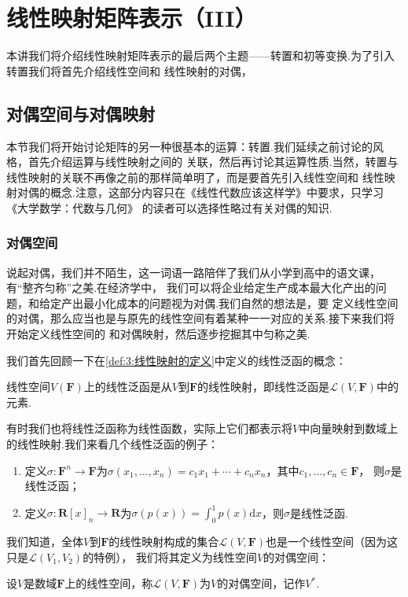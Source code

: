 \chapter{线性映射矩阵表示（III）}

本讲我们将介绍线性映射矩阵表示的最后两个主题——转置和初等变换.为了引入转置我们将首先介绍线性空间和
线性映射的对偶，

\section{对偶空间与对偶映射}
本节我们将开始讨论矩阵的另一种很基本的运算：转置.我们延续之前讨论的风格，首先介绍运算与线性映射之间的
关联，然后再讨论其运算性质.当然，转置与线性映射的关联不再像之前的那样简单明了，而是要首先引入线性空间和
线性映射对偶的概念.注意，这部分内容只在《线性代数应该这样学》中要求，只学习《大学数学：代数与几何》
的读者可以选择性略过有关对偶的知识.

\subsection{对偶空间}
说起对偶，我们并不陌生，这一词语一路陪伴了我们从小学到高中的语文课，有``整齐匀称''之美.在经济学中，
我们可以将企业给定生产成本最大化产出的问题，和给定产出最小化成本的问题视为对偶.我们自然的想法是，要
定义线性空间的对偶，那么应当也是与原先的线性空间有着某种一一对应的关系.接下来我们将开始定义线性空间的
和对偶映射，然后逐步挖掘其中匀称之美.

我们首先回顾一下在\autoref{def:3:线性映射的定义}中定义的线性泛函的概念：
\begin{definition}
    线性空间$V(\mathbf{F})$上的线性泛函是从$V$到$\mathbf{F}$的线性映射，即线性泛函是$\mathcal{L}(V,\mathbf{F})$中的元素.
\end{definition}
有时我们也将线性泛函称为线性函数，实际上它们都表示将$V$中向量映射到数域上的线性映射.我们来看几个线性泛函的例子：
\begin{enumerate}
    \item 定义$\sigma:\mathbf{F}^n\to\mathbf{F}$为$\sigma(x_1,\ldots,x_n)=c_1x_1+\cdots+c_nx_n$，其中$c_1,\ldots,c_n\in\mathbf{F}$，
    则$\sigma$是线性泛函；
    \item 定义$\sigma:\mathbf{R}[x]_n\to\mathbf{R}$为$\sigma(p(x))=\int_0^1p(x)\mathrm{d}x$，则$\sigma$是线性泛函.
\end{enumerate}

我们知道，全体$V$到$\mathbf{F}$的线性映射构成的集合$\mathcal{L}(V,\mathbf{F})$也是一个线性空间（因为这只是$\mathcal{L}(V_1,V_2)$的特例），
我们将其定义为线性空间$V$的对偶空间：
\begin{definition}
    设$V$是数域$\mathbf{F}$上的线性空间，称$\mathcal{L}(V,\mathbf{F})$为$V$的对偶空间，记作$V^*$.
\end{definition}

